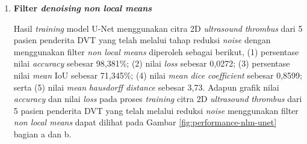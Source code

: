 \begin{enumerate}
	\item \textbf{Filter \textit{denoising} \textit{non local means}}
	
	Hasil \textit{training} model U-Net menggunakan citra 2D \textit{ultrasound} \textit{thrombus} dari 5 pasien penderita DVT yang telah melalui tahap reduksi \textit{noise} dengan menggunakan filter \textit{non local means} diperoleh sebagai berikut, (1) persentase nilai \textit{accuracy} sebesar 98,381\%; (2) nilai \textit{loss} sebesar 0,0272; (3) persentase nilai \textit{mean} IoU sebesar 71,345\%; (4) nilai \textit{mean} \textit{dice coefficient} sebesar 0,8599; serta (5) nilai \textit{mean} \textit{hausdorff distance} sebesar 3,73. Adapun grafik nilai \textit{accuracy} dan nilai \textit{loss} pada proses \textit{training} citra 2D \textit{ultrasound} \textit{thrombus} dari 5 pasien penderita DVT yang telah melalui reduksi \textit{noise} menggunakan filter \textit{non local means} dapat dilihat pada Gambar \ref{fig:performance-nlm-unet} bagian a dan b.
	

\end{enumerate}
